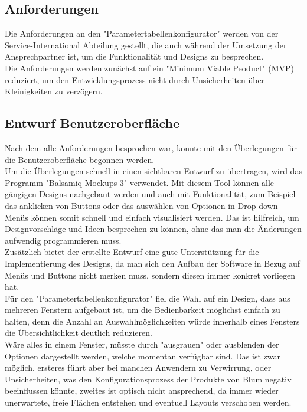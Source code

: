 \documentclass[10pt,a4paper]{article}
\begin{document}
\subsection{Anforderungen}
Die Anforderungen an den "Parametertabellenkonfigurator" werden von der Service-International Abteilung gestellt, die auch während der Umsetzung der Ansprechpartner ist, um die Funktionalität und Designs zu besprechen. 
\\Die Anforderungen werden zunächst auf ein "Minimum Viable Peoduct" (MVP) reduziert, um den Entwicklungsprozess nicht durch Unsicherheiten über Kleinigkeiten zu verzögern. \\
\subsection{Entwurf Benutzeroberfläche}
Nach dem alle Anforderungen besprochen war, konnte mit den Überlegungen für die Benutzeroberfläche begonnen werden. \\
Um die Überlegungen schnell in einen sichtbaren Entwurf zu übertragen, wird das Programm "Balsamiq Mockups 3" verwendet. Mit diesem Tool können alle gängigen Designs nachgebaut werden und auch mit Funktionalität, zum Beispiel das anklicken von Buttons oder das auswählen von Optionen in Drop-down Menüs können somit schnell und einfach visualisiert werden. Das ist hilfreich, um Designvorschläge und Ideen besprechen zu können, ohne das man die Änderungen aufwendig programmieren muss.
\\Zusätzlich bietet der erstellte Entwurf eine gute Unterstützung für die Implementierung des Designs, da man sich den Aufbau der Software in Bezug auf Menüs und Buttons nicht merken muss, sondern diesen immer konkret vorliegen hat.
\\Für den "Parametertabellenkonfigurator" fiel die Wahl auf ein Design, dass aus mehreren Fenstern aufgebaut ist, um die Bedienbarkeit möglichst einfach zu halten, denn die Anzahl an Auswahlmöglichkeiten würde innerhalb eines Fensters die Übersichtlichkeit deutlich reduzieren.
\\ Wäre alles in einem Fenster, müsste durch "ausgrauen" oder ausblenden der Optionen dargestellt werden, welche momentan verfügbar sind. Das ist zwar möglich, ersteres führt aber bei manchen Anwendern zu Verwirrung, oder Unsicherheiten, was den Konfigurationsprozess der Produkte von Blum negativ beeinflussen könnte, zweites ist optisch nicht ansprechend, da immer wieder unerwartete, freie Flächen entstehen und eventuell Layouts verschoben werden. \\
\end{document}
